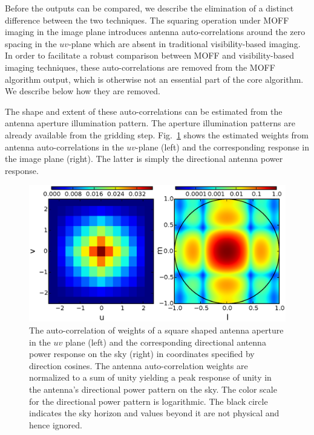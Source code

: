 \documentclass[a4paper,fleqn,usenatbib]{mnras}
\begin{document}
Before the outputs can be compared, we describe the elimination of a distinct difference between the two techniques. The squaring operation under MOFF imaging in the image plane introduces antenna auto-correlations around the zero spacing in the $uv$-plane which are absent in traditional visibility-based imaging. In order to facilitate a robust comparison between MOFF and visibility-based imaging techniques, these auto-correlations are removed from the MOFF algorithm output, which is otherwise not an essential part of the core algorithm. We describe below how they are removed. 

The shape and extent of these auto-correlations can be estimated from the 
antenna aperture illumination pattern. The aperture illumination patterns
are already available from the gridding step. Fig.~\ref{fig:autocorr_wts_PB} 
shows the estimated weights from antenna auto-correlations in the $uv$-plane 
(left) and the corresponding response in the image plane (right). The latter 
is simply the directional antenna power response. 

\begin{figure}
  \includegraphics[width=\columnwidth]{figure4}
  \caption{The auto-correlation of weights of a square shaped antenna aperture
    in the $uv$ plane (left) and the corresponding directional antenna power 
    response on the sky (right) in coordinates specified by direction cosines. 
    The antenna auto-correlation weights are normalized to a sum
    of unity yielding a peak response of unity in the antenna's directional
    power pattern on the sky. The color scale for the directional power 
    pattern is logarithmic. The black circle indicates the sky horizon and
    values beyond it are not physical and hence ignored.}
  \label{fig:autocorr_wts_PB}
\end{figure}
\end{document}
